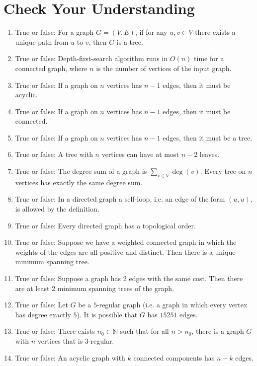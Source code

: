 

\section{Check Your Understanding}

\begin{enumerate}
    \item True or false: For a graph $G = (V, E)$, if for any $u, v \in V$ there exists a unique path from $u$ to $v$, then $G$ is a tree.
    \item True or false: Depth-first-search algorithm runs in $O(n)$ time for a connected graph, where $n$ is the number of vertices of the input graph.
    \item True or false: If a graph on $n$ vertices has $n-1$ edges, then it must be acyclic.
    \item True or false: If a graph on $n$ vertices has $n-1$ edges, then it must be connected.
    \item True or false: If a graph on $n$ vertices has $n-1$ edges, then it must be a tree.
    \item True or false: A tree with $n$ vertices can have at most $n - 2$ leaves.
    \item True or false: The degree sum of a graph is $\sum_{v \in V} \deg(v)$. Every tree on $n$ vertices has exactly the same degree sum.
    \item True or false: In a directed graph a self-loop, i.e. an edge of the form $(u,u)$, is allowed by the definition.
    \item True or false: Every directed graph has a topological order.
    \item True or false: Suppose we have a weighted connected graph in which the weights of the edges are all positive and distinct. Then there is a unique minimum spanning tree.
    \item True or false: Suppose a graph has $2$ edges with the same cost. Then there are at least $2$ minimum spanning trees of the graph.
    \item True or false: Let $G$ be a $5$-regular graph (i.e. a graph in which every vertex has degree exactly $5$). It is possible that $G$ has $15251$ edges.
    \item True or false: There exists $n_0 \in \mathbb{N}$ such that for all $n > n_0$, there is a graph $G$ with $n$ vertices that is $3$-regular.
    \item True or false: An acyclic graph with $k$ connected components has $n-k$ edges.
\end{enumerate}



